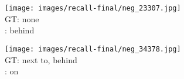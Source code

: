 \documentclass[10pt,twocolumn,letterpaper]{article}
\begin{document}
\begin{figure*}[t]
    \begin{minipage}[b]{0.18\textwidth}
    	\centering
       	\texttt{[image: images/recall-final/neg\_23307.jpg]}\\
       	\vspace{0.2ex}
       	\small{
       	GT: none\\
       	\cite{Lu16}: behind
       	}
       	\vspace{0.3ex}
    \end{minipage}
    \hspace{0.005\textwidth}  
    \begin{minipage}[b]{0.18\textwidth}
    	\centering
       	\texttt{[image: images/recall-final/neg\_34378.jpg]}\\
       	\vspace{0.2ex}
       	\small{
       	GT: next to, behind\\
       	\cite{Lu16}: on
       	}
      	\vspace{0.3ex}
    \end{minipage} 
    

\end{figure*}
\end{document}
